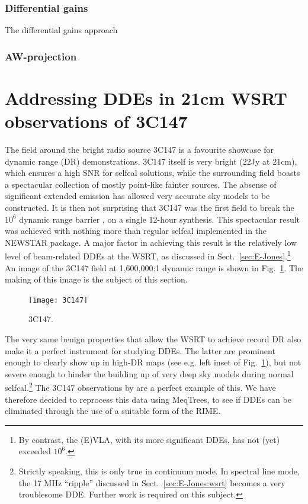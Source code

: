 \documentclass[]{aa}
\begin{document}
\subsubsection{Differential gains}

The differential gains approach


\subsubsection{AW-projection\label{sec:awproj}}



\section{Addressing DDEs in 21cm WSRT observations of \label{sec:3C147}3C147}

The field around the bright radio source 3C147 is a favourite showcase for dynamic range (DR) demonstrations. 3C147 itself is very bright (22Jy at 21cm), which ensures a high SNR for selfcal solutions, while the surrounding field boasts a spectacular collection of mostly point-like fainter sources. The absense of significant extended emission has allowed very accurate sky models to be constructed. It is then not surprising that 3C147 was the first field to break the $10^6$ dynamic range barrier \citep{deBruyn:million,deBruyn:3C147}, on a single 12-hour synthesis. This spectacular result was achieved with nothing more than regular selfcal implemented in the NEWSTAR package. A major factor in achieving this result is the relatively low level of beam-related DDEs at the WSRT, as discussed in 
Sect.~\ref{sec:E-Jones}.\footnote{By contrast, the (E)VLA, with its more significant DDEs, has not (yet) exceeded $10^6$.} An image of the 3C147 field at 1,600,000:1 dynamic range is shown in Fig.~\ref{fig:3C147}. The making of this image is the subject of this section. 

\begin{figure}
\sidecaption
\centering
\texttt{[image: 3C147]}
\caption{\label{fig:3C147}3C147.}
\end{figure}


The very same benign properties that allow the WSRT to achieve record DR also make it a perfect instrument for studying DDEs. The latter are prominent enough to clearly show up in high-DR maps (see e.g. left inset of Fig.~\ref{fig:3C147}), but not severe enough to hinder the building up of very deep sky models during normal selfcal.\footnote{Strictly speaking, this is only true in continuum mode. In spectral line mode, the 17 MHz ``ripple'' discussed in Sect.~\ref{sec:E-Jones:wsrt} becomes a very troublesome DDE. Further work is required on this subject.} The 3C147 observations by \citet{deBruyn:3C147} are a perfect example of this. We have therefore decided to reprocess this data using MeqTrees, to see if DDEs can be eliminated through the use of a suitable form of the RIME.
\end{document}
